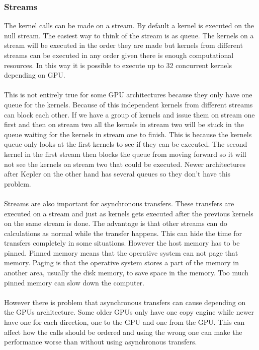\documentclass[10pt,a4paper]{report}
\begin{document}
\subsubsection{Streams}
The kernel calls can be made on a stream. By default a kernel is executed on the null stream. The easiest way to think of the stream is as queue. The kernels on a stream will be executed in the order they are made but kernels from different streams can be executed in any order given there is enough computational resources. In this way it is possible to execute up to 32 concurrent kernels depending on GPU.\cite{cuda}\\
\\
This is not entirely true for some GPU architectures because they only have one queue for the kernels. Because of this independent kernels from different streams can block each other. If we have a group of kernels and issue them on stream one first and then on stream two all the kernels in stream two will be stuck in the queue waiting for the kernels in stream one to finish. This is because the kernels queue only looks at the first kernels to see if they can be executed. The second kernel in the first stream then blocks the queue from moving forward so it will not see the kernels on stream two that could be executed. Newer architectures after Kepler on the other hand has several queues so they don't have this problem.\cite{cuda, cuda_best_practice, kepler_tuning_guide}\\
\\
Streams are also important for asynchronous transfers. These transfers are executed on a stream and just as kernels gets executed after the previous kernels on the same stream is done. The advantage is that other streams can do calculations as normal while the transfer happens. This can hide the time for transfers completely in some situations. However the host memory has to be pinned. Pinned memory means that the operative system can not page that memory. Paging is that the operative system stores a part of the memory in another area, usually the disk memory, to save space in the memory. Too much pinned memory can slow down the computer.\cite{cuda, overlap_transfers_cuda}\\
\\


However there is problem that asynchronous transfers can cause depending on the GPUs architecture. Some older GPUs only have one copy engine while newer have one for each direction, one to the GPU and one from the GPU. This can affect how the calls should be ordered and using the wrong one can make the performance worse than without using asynchronous transfers.\cite{overlap_transfers_cuda} %
\end{document}
